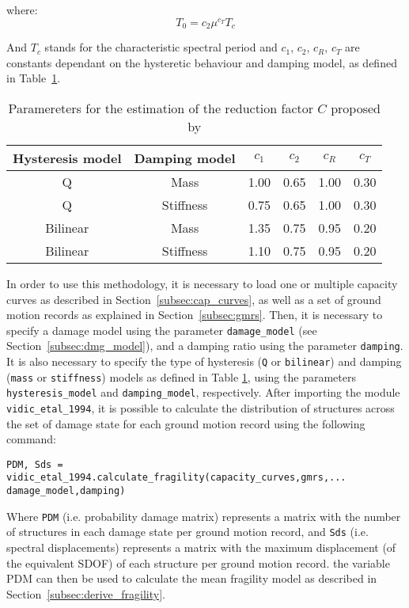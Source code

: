 where:
\begin{equation}
T_0 = c_2\mu^{c_T}T_c
\end{equation}

And $T_c$ stands for the characteristic spectral period and $c_1$, $c_2$, $c_R$, $c_T$ are constants dependant on the hysteretic behaviour and damping model, as defined in Table~\ref{table:VidicEtAl}.

\begin {table}[htb]
\caption{Paramereters for the estimation of the reduction factor $C$ proposed by \citep{VidicEtAl1994}}
\label{table:VidicEtAl}
\begin{center}
  \begin{tabular}{ | c | c | c | c | c | c |}
    \hline
    Hysteresis model & Damping model & $c_1$ & $c_2$ & $c_R$ & $c_T$ \\ \hline
    Q & Mass & 1.00 & 0.65 & 1.00 & 0.30 \\ \hline
    Q & Stiffness & 0.75 & 0.65 & 1.00 & 0.30 \\ \hline
    Bilinear & Mass & 1.35 & 0.75 & 0.95 & 0.20 \\ \hline
    Bilinear & Stiffness & 1.10 & 0.75 & 0.95 & 0.20 \\ \hline
  \end{tabular}
\end{center}
\end{table}

In order to use this methodology, it is necessary to load one or multiple capacity curves as described in Section~\ref{subsec:cap_curves}, as well as a set of ground motion records as explained in Section~\ref{subsec:gmrs}. Then, it is necessary to specify a damage model using the parameter \verb=damage_model= (see Section~\ref{subsec:dmg_model}), and a damping ratio using the parameter \verb=damping=. It is also necessary to specify the type of hysteresis (\verb=Q= or \verb=bilinear=) and damping (\verb=mass= or \verb=stiffness=) models as defined in Table \ref{table:VidicEtAl}, using the parameters \verb=hysteresis_model= and \verb=damping_model=, respectively. After importing the module \verb=vidic_etal_1994=, it is possible to calculate the distribution of structures across the set of damage state for each ground motion record using the following command:

\begin{Verbatim}[frame=single, commandchars=\\\{\}, samepage=true]
PDM, Sds = vidic_etal_1994.calculate_fragility(capacity_curves,gmrs,...
damage_model,damping)
\end{Verbatim}

Where \verb=PDM= (i.e. probability damage matrix) represents a matrix with the number of structures in each damage state per ground motion record, and \verb=Sds= (i.e. spectral displacements) represents a matrix with the maximum displacement (of the equivalent SDOF) of each structure per ground motion record. the variable PDM can then be used to calculate the mean fragility model as described in Section~\ref{subsec:derive_fragility}.